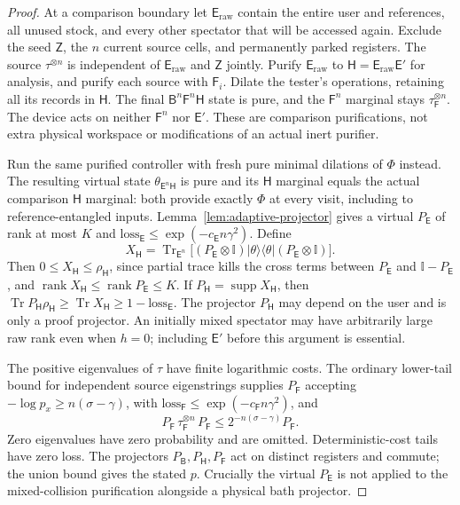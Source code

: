 \documentclass[11pt,a4paper]{article}
\numberwithin{equation}{section}
\theoremstyle{plain}
\theoremstyle{definition}
\DeclareMathOperator{\Tr}{Tr}
\DeclareMathOperator{\rank}{rank}
\DeclareMathOperator{\supp}{supp}
\newcommand{\rg}[1]{\mathsf{#1}}
\newcommand{\one}{\mathbb{I}}
\newcommand{\ketbra}[2]{\lvert #1 \rangle\langle #2 \rvert}
\begin{document}
\begin{proof}
At a comparison boundary let $\rg{E}_{\mathrm{raw}}$ contain the entire user
and references, all unused stock, and every other spectator that will be
accessed again. Exclude the seed $\rg{Z}$, the $n$ current source cells, and
permanently parked registers. The source $\tau^{\otimes n}$ is independent of
$\rg{E}_{\mathrm{raw}}$ and $\rg{Z}$ jointly. Purify
$\rg{E}_{\mathrm{raw}}$ to $\rg{H}=\rg{E}_{\mathrm{raw}}\rg{E}'$ for analysis,
and purify each source with $\rg{F}_i$. Dilate the tester's operations,
retaining all its records in $\rg{H}$. The final
$\rg{B}^n\rg{F}^n\rg{H}$ state is pure, and the $\rg{F}^n$ marginal stays
$\tau_{\rg{F}}^{\otimes n}$. The device acts on neither $\rg{F}^n$ nor
$\rg{E}'$. These are comparison purifications, not extra physical workspace or
modifications of an actual inert purifier.

Run the same purified controller with fresh pure minimal dilations of $\Phi$
instead. The resulting virtual state $\theta_{\rg{E}^n\rg{H}}$ is pure and its
$\rg{H}$ marginal equals the actual comparison $\rg{H}$ marginal: both provide
exactly $\Phi$ at every visit, including to reference-entangled inputs.
Lemma~\ref{lem:adaptive-projector} gives a virtual $P_{\rg{E}}$ of rank at
most $K$ and $\mathrm{loss}_{\rg{E}}\le\exp(-c_{\rg{E}}n\gamma^2)$. Define
\[
X_{\rg{H}}=\Tr_{\rg{E}^n}\bigl[(P_{\rg{E}}\otimes\one)
\ketbra{\theta}{\theta}(P_{\rg{E}}\otimes\one)\bigr].
\]
Then $0\le X_{\rg{H}}\le\rho_{\rg{H}}$, since partial trace kills the cross
terms between $P_{\rg{E}}$ and $\one-P_{\rg{E}}$, and
$\rank X_{\rg{H}}\le\rank P_{\rg{E}}\le K$. If
$P_{\rg{H}}=\supp X_{\rg{H}}$, then
$\Tr P_{\rg{H}}\rho_{\rg{H}}\ge\Tr X_{\rg{H}}\ge 1-\mathrm{loss}_{\rg{E}}$.
The projector $P_{\rg{H}}$ may depend on the user and is only a proof
projector. An initially mixed spectator may have arbitrarily large raw rank
even when $h=0$; including $\rg{E}'$ before this argument is essential.

The positive eigenvalues of $\tau$ have finite logarithmic costs. The ordinary
lower-tail bound for independent source eigenstrings supplies $P_{\rg{F}}$
accepting $-\log p_x\ge n(\sigma-\gamma)$, with
$\mathrm{loss}_{\rg{F}}\le\exp(-c_{\rg{F}}n\gamma^2)$, and
\[
P_{\rg{F}}\,\tau_{\rg{F}}^{\otimes n}\,P_{\rg{F}}
\le 2^{-n(\sigma-\gamma)}P_{\rg{F}} .
\]
Zero eigenvalues have zero probability and are omitted. Deterministic-cost
tails have zero loss. The projectors $P_{\rg{B}},P_{\rg{H}},P_{\rg{F}}$ act on
distinct registers and commute; the union bound gives the stated $p$.
Crucially the virtual $P_{\rg{E}}$ is not applied to the mixed-collision
purification alongside a physical bath projector.


\end{proof}
\end{document}
